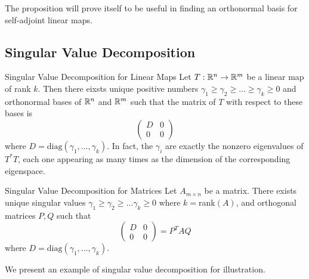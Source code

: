 \documentclass[a4paper]{article}
\begin{document}
The proposition will prove itself to be useful in finding an orthonormal basis for self-adjoint linear maps. 

\subsection{Singular Value Decomposition}
\begin{thm}{Singular Value Decomposition for Linear Maps}{} Let $T:\mathbb{R}^n\to\mathbb{R}^m$ be a linear map of rank $k$. Then there eixsts unique positive numbers $\gamma_1\geq\gamma_2\geq\dots\geq\gamma_k\geq0$ and orthonormal bases of $\mathbb{R}^n$ and $\mathbb{R}^m$ such that the matrix of $T$ with respect to these bases is $$\begin{pmatrix}
D & 0\\
0 & 0
\end{pmatrix}$$ where $D=\text{diag}(\gamma_1,\dots,\gamma_k)$. In fact, the $\gamma_i$ are exactly the nonzero eigenvalues of $T^*T$, each one appearing as many times as the dimension of the corresponding eigenspace. 
\end{thm}

\begin{thm}{Singular Value Decomposition for Matrices}{} Let $A_{m\times n}$ be a matrix. There exists unique singular values $\gamma_1\geq\gamma_2\geq\dots\gamma_k\geq0$ where $k=$rank$(A)$, and orthogonal matrices $P,Q$ such that $$\begin{pmatrix}
D & 0\\
0 & 0
\end{pmatrix}=P^TAQ$$ where $D=\text{diag}(\gamma_1,\dots,\gamma_k)$. 
\end{thm}

We present an example of singular value decomposition for illustration. 
\end{document}
